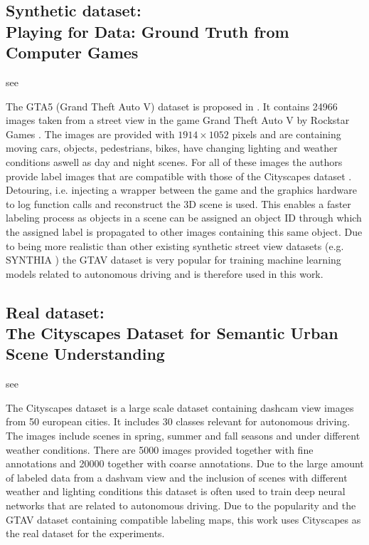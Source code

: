 \subsection{Synthetic dataset: \\
	Playing for Data: Ground Truth from Computer Games}
see \cite{Richter_2016_ECCV}

The GTA5 (Grand Theft Auto V) dataset is proposed in \cite{Richter_2016_ECCV}. It contains 24966 images taken from a street view in the game Grand Theft Auto V by Rockstar Games \cite{GTAV}. The images are provided with $1914 \times 1052$ pixels and are containing moving cars, objects, pedestrians, bikes, have changing lighting and weather conditions aswell as day and night scenes. For all of these images the authors provide label images that are compatible with those of the Cityscapes dataset \cite{Cordts_2016_CVPR}. Detouring, i.e. injecting a wrapper between the game and the graphics hardware to log function calls and reconstruct the 3D scene is used. This enables a faster labeling process as objects in a scene can be assigned an object ID through which the assigned label is propagated to other images containing this same object. Due to being more realistic than other existing synthetic street view datasets (e.g. SYNTHIA \cite{RosCVPR16}) the GTAV dataset is very popular for training machine learning models related to autonomous driving and is therefore used in this work.


\subsection{Real dataset:\\
	The Cityscapes Dataset for Semantic Urban Scene Understanding}
see \cite{Cordts_2016_CVPR}

The Cityscapes dataset is a large scale dataset containing dashcam view images from 50 european cities. It includes 30 classes relevant for autonomous driving. The images include scenes in spring, summer and fall seasons and under different weather conditions. There are 5000 images provided together with fine annotations and 20000 together with coarse annotations. Due to the large amount of labeled data from a dashvam view and the inclusion of scenes with different weather and lighting conditions this dataset is often used to train deep neural networks that are related to autonomous driving. Due to the popularity and the GTAV dataset containing compatible labeling maps, this work uses Cityscapes as the real dataset for the experiments.

